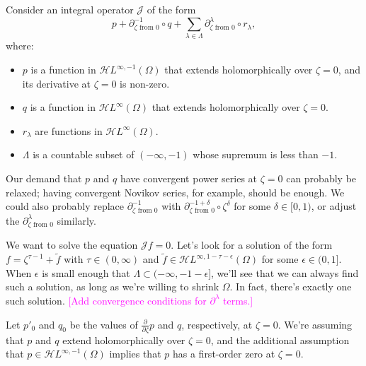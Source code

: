 \documentclass{article}
\theoremstyle{definition}
\newcommand{\holoL}[1]{\mathcal{H}L^{#1}} %
\begin{document}
Consider an integral operator $\mathcal{J}$ of the form
\[ p + \partial^{-1}_{\zeta \text{ from } 0} \circ q + \sum_{\lambda \in \Lambda} \partial^\lambda_{\zeta \text{ from } 0} \circ r_\lambda, \]
where:
\begin{itemize}
\item $p$ is a function in $\holoL{\infty, -1}(\Omega)$ that extends holomorphically over $\zeta = 0$, and its derivative at $\zeta = 0$ is non-zero.
\item $q$ is a function in $\holoL{\infty}(\Omega)$ that extends holomorphically over $\zeta = 0$.
\item $r_\lambda$ are functions in $\holoL{\infty}(\Omega)$.
\item $\Lambda$ is a countable subset of $(-\infty, -1)$ whose supremum is less than $-1$.
\end{itemize}
Our demand that $p$ and $q$ have convergent power series at $\zeta = 0$ can probably be relaxed; having convergent Novikov series, for example, should be enough. We could also probably replace $\partial^{-1}_{\zeta \text{ from } 0}$ with $\partial^{-1+\delta}_{\zeta \text{ from } 0} \circ \zeta^\delta$ for some $\delta \in [0, 1)$, or adjust the $\partial^\lambda_{\zeta \text{ from } 0}$ similarly.

We want to solve the equation $\mathcal{J}f = 0$. Let's look for a solution of the form $f = \zeta^{\tau-1} + \tilde{f}$ with $\tau \in (0, \infty)$ and $\tilde{f} \in \holoL{\infty, 1-\tau-\epsilon}(\Omega)$ for some $\epsilon \in (0, 1]$. When $\epsilon$ is small enough that $\Lambda \subset (-\infty, -1 - \epsilon]$, we'll see that we can always find such a solution, as long as we're willing to shrink $\Omega$. In fact, there's exactly one such solution. \textcolor{magenta}{[Add convergence conditions for $\partial^\lambda$ terms.]}

Let $p'_0$ and $q_0$ be the values of $\tfrac{\partial}{\partial \zeta} p$ and $q$, respectively, at $\zeta = 0$. We're assuming that $p$ and $q$ extend holomorphically over $\zeta = 0$, and the additional assumption that $p \in \holoL{\infty, -1}(\Omega)$ implies that $p$ has a first-order zero at $\zeta = 0$.
\end{document}

